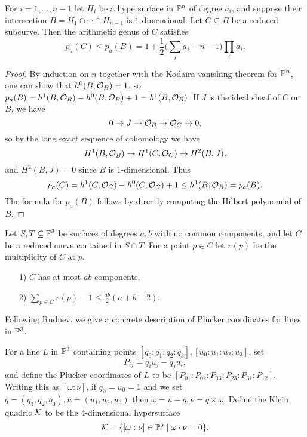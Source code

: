 \begin{prop}[Koll\'ar] For $i = 1, ..., n-1$ let $H_i$ be a hypersurface in $\mathbb{P}^n$ of degree $a_i$, and suppose their intersection $B = H_1 \cap \cdots \cap H_{n-1}$ is $1$-dimensional. Let $C\subseteq B$ be a reduced subcurve. Then the arithmetic genus of $C$ satisfies
\[
p_a(C) \le p_a(B) = 1 + \frac{1}{2}\bigg(\sum_i a_i - n - 1\bigg)\prod_i a_i.
\]
\end{prop}
\begin{proof} By induction on $n$ together with the Kodaira vanishing theorem for $\mathbb{P}^n$, one can show that $h^0(B,\mathcal{O}_B) = 1$, so $p_a(B) = h^1(B,\mathcal{O}_B)-h^0(B,\mathcal{O}_B)+1 = h^1(B,\mathcal{O}_B)$. If $J$ is the ideal sheaf of $C$ on $B$, we have
\[
0\rightarrow J \rightarrow \mathcal{O}_B \rightarrow \mathcal{O}_C \rightarrow 0,
\]
so by the long exact sequence of cohomology we have
\[
H^1(B,\mathcal{O}_B) \rightarrow H^1(C,\mathcal{O}_C) \rightarrow H^2(B,J),
\]
and $H^2(B,J) = 0$ since $B$ is $1$-dimensional. Thus
\[
p_a(C) = h^1(C,\mathcal{O}_C) - h^0(C,\mathcal{O}_C) + 1 \le h^1(B,\mathcal{O}_B) = p_a(B).
\]
The formula for $p_a(B)$ follows by directly computing the Hilbert polynomial of $B$.
\end{proof}

\begin{prop}[Koll\'ar]\label{intersect} Let $S,T\subseteq \mathbb{P}^3$ be surfaces of degrees $a,b$ with no common components, and let $C$ be a reduced curve contained in $S\cap T$. For a point $p\in C$ let $r(p)$ be the multiplicity of $C$ at $p$.
\begin{itemize}
\item[1)] $C$ has at most $ab$ components.
\item[2)] $\sum_{p\in C} r(p)-1 \le \frac{ab}{2}(a+b-2)$.
\end{itemize}
\end{prop}

Following Rudnev, we give a concrete description of Pl\"ucker coordinates for lines in $\mathbb{P}^3$.

\begin{defn} For a line $L$ in $\mathbb{P}^3$ containing points $[q_0:q_1:q_2:q_3], [u_0:u_1:u_2:u_3]$, set
\[
P_{ij} = q_iu_j-q_ju_i,
\]
and define the Pl\"ucker coordinates of $L$ to be $[P_{01}:P_{02}:P_{03}:P_{23}:P_{31}:P_{12}]$. Writing this as $[\omega:\nu]$, if $q_0 = u_0 = 1$ and we set $q = (q_1,q_2,q_3), u = (u_1,u_2,u_3)$ then $\omega = u-q, \nu = q\times\omega$. Define the Klein quadric $\mathcal{K}$ to be the $4$-dimensional hypersurface
\[
\mathcal{K} = \{[\omega:\nu]\in \mathbb{P}^5\mid \omega\cdot\nu = 0\}.
\]
\end{defn}

